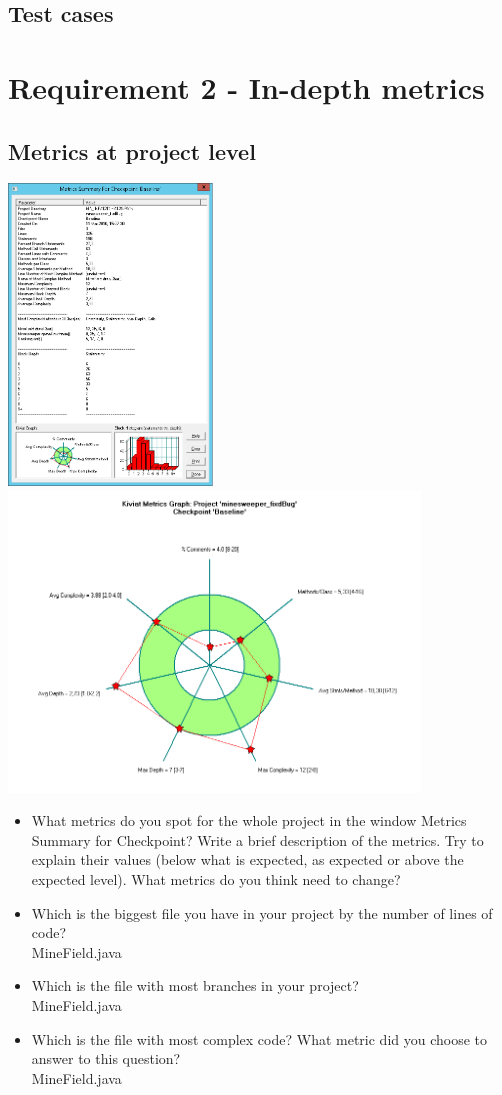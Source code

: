 \documentclass[UKenglish]{article}  %
\begin{document}
\subsection{Test cases}

\section{Requirement 2 - In-depth metrics}

\subsection{Metrics at project level}
\includegraphics[height=8cm]{metric_summary}
\includegraphics[height=8cm]{kiviat_diagram_baseline}
\begin{itemize}
\item What metrics do you spot for the whole project in the window Metrics Summary for Checkpoint? Write a brief description of the metrics. Try to explain their values (below what is expected, as expected or above the expected level). What metrics do you think need to change?\\
\item Which is the biggest file you have in your project by the number of lines of code? \\
MineField.java
\item Which is the file with most branches in your project?\\
MineField.java
\item Which is the file with most complex code? What metric did you choose to answer to this question?\\
MineField.java
\end{itemize}
\end{document}
